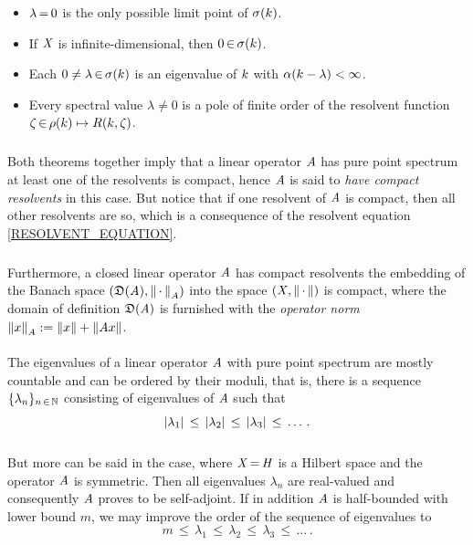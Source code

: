 \documentclass[11pt,twoside]{article}
\begin{document}
\begin{itemize}[leftmargin=12pt]
\begin{theorem}
\begin{itemize}[leftmargin=15pt]
\item[(b)]
$\lambda {\,=\,} 0$ is the only possible limit point of $\sigma(k)$.

\item[(c)]
If $\mathit{X}$ is infinite-dimensional, then $0 {\,\in\,} \sigma(k)$.

\item[(d)]
Each $0 \neq \lambda {\,\in\,} \sigma(k)$ is an eigenvalue of $k$
with $\alpha(k-\lambda) < \infty$. %

\item[(e)]
Every spectral value $\lambda \neq 0$ is a pole of finite order
of the resolvent function $\zeta {\,\in\,} \rho(k) \mapsto R(k,\zeta)$.
\end{itemize}
\end{theorem}
\end{itemize}

\subparagraph{} %
Both theorems together imply
that a linear operator $\mathit{A}$ has pure point spectrum
\iff
at least one of the resolvents is compact,
hence $\mathit{A}$ is said to \textit{have compact resolvents} in this case.
But notice that if one resolvent of $\mathit{A}$ is compact,
then all other resolvents are so,
which is a consequence of the resolvent equation \eqref{RESOLVENT_EQUATION}.

\subparagraph{} %
Furthermore,
a closed linear operator $\mathit{A}$ has compact resolvents
\iff the embedding of the Banach space $(\mathfrak{D}(\mathit{A}),\left\lVert \,\cdot\, \right\rVert_A)$
into the space $(\mathit{X},\left\lVert \,\cdot\, \right\rVert)$ is compact,
where the domain of definition $\mathfrak{D}(\mathit{A})$ is furnished with
the \textit{operator norm} $\left\lVert x \right\rVert_A := \left\lVert x \right\rVert + \left\lVert \mathit{A} x \right\rVert$.

\paragraph{} %
The eigenvalues of a linear operator $\mathit{A}$ with pure point spectrum
are mostly countable and can be ordered by their moduli,
that is,
there is a sequence $\{ \lambda_n \}_{n {\,\in\,} {\mathbb{N}}}$ consisting
of eigenvalues of $\mathit{A}$
such that
\[
\abs{\lambda_1} \,\leq\, \abs{\lambda_2} \,\leq\, \abs{\lambda_3} \,\leq\,
\ldots \, .
\]

\subparagraph{} %
But more can be said in the case,
where $\mathit{X} {\,=\,} \mathit{H}$ is a Hilbert space
and the operator $\mathit{A}$ is symmetric.
Then all eigenvalues $\lambda_n$ are real-valued
and consequently $\mathit{A}$ proves to be self-adjoint.
If in addition $\mathit{A}$ is half-bounded with lower bound $m$,
we may improve the order of the sequence of eigenvalues to
\[
m \,\leq\, \lambda_1 \,\leq\, \lambda_2 \,\leq\, \lambda_3 \,\leq\, \ldots \, .
\]
\end{document}
